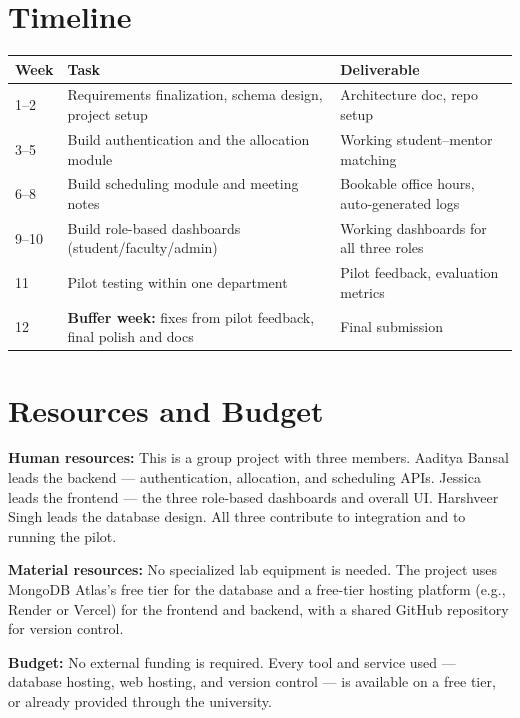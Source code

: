\documentclass[11pt]{article}
\begin{document}
\section{Timeline}
\begin{center}
\begin{tabular}{@{}p{1.6cm}p{6.2cm}p{6.2cm}@{}}
\toprule
\textbf{Week} & \textbf{Task} & \textbf{Deliverable} \\
\midrule
1--2 & Requirements finalization, schema design, project setup & Architecture doc, repo setup \\
3--5 & Build authentication and the allocation module & Working student--mentor matching \\
6--8 & Build scheduling module and meeting notes & Bookable office hours, auto-generated logs \\
9--10 & Build role-based dashboards (student/faculty/admin) & Working dashboards for all three roles \\
11 & Pilot testing within one department & Pilot feedback, evaluation metrics \\
12 & \textbf{Buffer week:} fixes from pilot feedback, final polish and docs & Final submission \\
\bottomrule
\end{tabular}
\end{center}

\section{Resources and Budget}
\textbf{Human resources:} This is a group project with three members. Aaditya Bansal leads the backend --- authentication, allocation, and scheduling APIs. Jessica leads the frontend --- the three role-based dashboards and overall UI. Harshveer Singh leads the database design. All three contribute to integration and to running the pilot.

\textbf{Material resources:} No specialized lab equipment is needed. The project uses MongoDB Atlas's free tier for the database and a free-tier hosting platform (e.g., Render or Vercel) for the frontend and backend, with a shared GitHub repository for version control.

\textbf{Budget:} No external funding is required. Every tool and service used --- database hosting, web hosting, and version control --- is available on a free tier, or already provided through the university.
\end{document}
